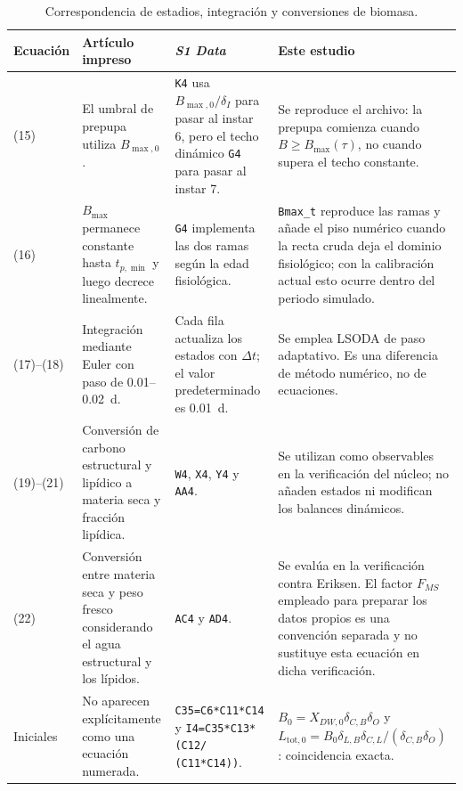 \begin{table}[htbp]
  \centering
  \small
  \caption{Correspondencia de estadios, integración y conversiones de
  biomasa.}
  \label{tab:s9-conversiones}
  \setlength{\tabcolsep}{3pt}
  \begin{tabular}{p{1.0cm}p{3.8cm}p{4.2cm}p{5.0cm}}
    \toprule
    Ecuación & Artículo impreso & \emph{S1 Data} & Este estudio \\
    \midrule
    (15) &
    El umbral de prepupa utiliza $B_{\max,0}$. &
    \texttt{K4} usa $B_{\max,0}/\delta_I$ para pasar al instar 6, pero el
    techo dinámico \texttt{G4} para pasar al instar 7. &
    Se reproduce el archivo: la prepupa comienza cuando
    $B\geq B_{\max}(\tau)$, no cuando supera el techo constante. \\
    \midrule
    (16) &
    $B_{\max}$ permanece constante hasta $t_{p,\min}$ y luego decrece
    linealmente. &
    \texttt{G4} implementa las dos ramas según la edad fisiológica. &
    \texttt{Bmax\_t} reproduce las ramas y añade el piso numérico cuando la
    recta cruda deja el dominio fisiológico; con la calibración actual esto
    ocurre dentro del periodo simulado. \\
    \midrule
    (17)--(18) &
    Integración mediante Euler con paso de 0.01--0.02~d. &
    Cada fila actualiza los estados con $\Delta t$; el valor predeterminado
    es 0.01~d. &
    Se emplea LSODA de paso adaptativo. Es una diferencia de método
    numérico, no de ecuaciones. \\
    \midrule
    (19)--(21) &
    Conversión de carbono estructural y lipídico a materia seca y fracción
    lipídica. &
    \texttt{W4}, \texttt{X4}, \texttt{Y4} y \texttt{AA4}. &
    Se utilizan como observables en la verificación del núcleo; no añaden
    estados ni modifican los balances dinámicos. \\
    \midrule
    (22) &
    Conversión entre materia seca y peso fresco considerando el agua
    estructural y los lípidos. &
    \texttt{AC4} y \texttt{AD4}. &
    Se evalúa en la verificación contra Eriksen. El factor $F_{MS}$ empleado
    para preparar los datos propios es una convención separada y no sustituye
    esta ecuación en dicha verificación. \\
    \midrule
    Iniciales &
    No aparecen explícitamente como una ecuación numerada. &
    \texttt{C35=C6*C11*C14} y\newline
    \texttt{I4=C35*C13*(C12/}\newline
    \texttt{(C11*C14))}. &
    $B_0=X_{DW,0}\delta_{C,B}\delta_O$ y
    $L_{\mathrm{tot},0}=B_0\delta_{L,B}\delta_{C,L}/
    (\delta_{C,B}\delta_O)$: coincidencia exacta. \\
    \bottomrule
  \end{tabular}
\end{table}

